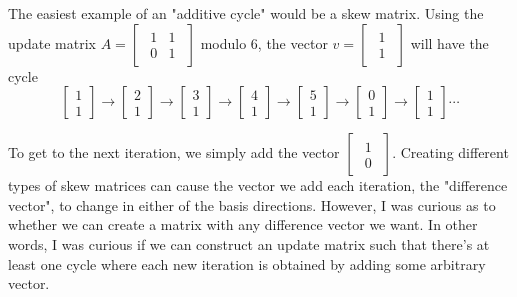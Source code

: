\documentclass[a4paper, 12pt, reqno]{amsart}
\begin{document}
			The easiest example of an "additive cycle" would be a skew matrix. Using the update matrix $A = 
			\begin{bmatrix}
				\begin{smallmatrix}
					1 & 1 \\
					0 & 1
				\end{smallmatrix}
			\end{bmatrix}
			$ modulo 6, the vector $v = 
			\begin{bmatrix}
				\begin{smallmatrix}
					1 \\
					1
				\end{smallmatrix}
			\end{bmatrix}$ will have the cycle
			\[
				\begin{bmatrix}
					1 \\
					1
				\end{bmatrix}
				\rightarrow
				\begin{bmatrix}
					2 \\
					1
				\end{bmatrix}
				\rightarrow
				\begin{bmatrix}
					3 \\
					1
				\end{bmatrix}
				\rightarrow
				\begin{bmatrix}
					4 \\
					1
				\end{bmatrix}
				\rightarrow
				\begin{bmatrix}
					5 \\
					1
				\end{bmatrix}
				\rightarrow
				\begin{bmatrix}
					0 \\
					1
				\end{bmatrix}
				\rightarrow
				\begin{bmatrix}
					1 \\
					1
				\end{bmatrix}
				\cdots
			\]
			
			To get to the next iteration, we simply add the vector 
			$
				\begin{bmatrix}
					\begin{smallmatrix}
						1 \\
						0
					\end{smallmatrix}
				\end{bmatrix}
			$.
			Creating different types of skew matrices can cause the vector we add each iteration, the "difference vector",
			to change in either of the basis directions. However, I was curious as to whether we can create a matrix with 
			any difference vector we want. In other words, I was curious if we can construct an update matrix such that 
			there's at least one cycle where each new iteration is obtained by adding some arbitrary vector.
			
\end{document}
